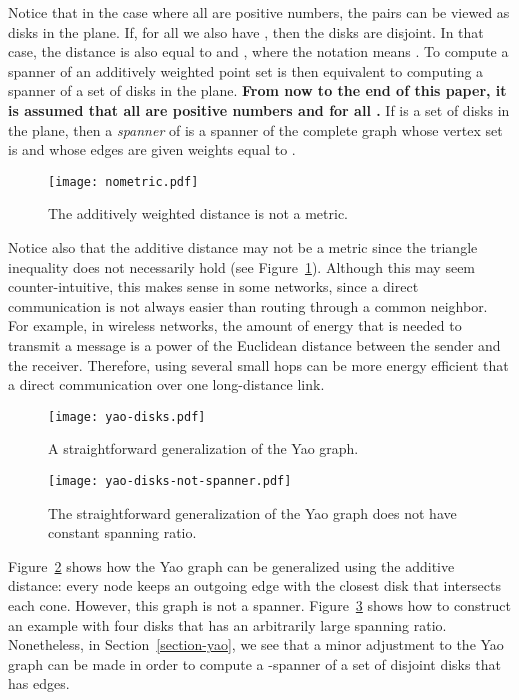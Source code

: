 \documentclass[pdftex,leqno,fleqn,12pt]{article}
\begin{document}
Notice that in the case where all  are positive numbers, the pairs
 can be viewed as disks  in the plane. If, for all  we
also have , then the disks are disjoint. In that case, the
distance  is also equal to
 and , where the notation 
means .  To compute a spanner of an additively weighted point
set is then equivalent to computing a spanner of a set of disks in the plane.
\textbf{From now to the end of this paper, it is assumed that all  are
positive numbers and  for all .} If  is a
set of disks in the plane, then a \emph{spanner} of  is a spanner
of the complete graph whose vertex set is  and whose edges
 are given weights equal to .

\begin{figure}
\centering\texttt{[image: nometric.pdf]}\caption{The additively weighted distance is not a
metric.}\label{fig-nometric}
\end{figure}

Notice also that the additive distance may not be a metric since the triangle inequality does not
necessarily hold (see Figure~\ref{fig-nometric}). Although this may seem counter-intuitive, this
makes sense in some networks, since a direct communication is not always easier than routing
through a common neighbor. For example, in wireless networks, the amount of energy that is needed
to transmit a message is a power of the Euclidean distance between the sender and the receiver.
Therefore, using several small hops can be more energy efficient that a direct communication over
one long-distance link.

\begin{figure}[htb]
\begin{center}
\texttt{[image: yao-disks.pdf]} \caption{A straightforward generalization of the Yao graph.}\label{fig-yao-disks}
\end{center}
\end{figure}

\begin{figure}[htb]
\begin{center}
\texttt{[image: yao-disks-not-spanner.pdf]}\caption{The straightforward generalization of the Yao graph
does not have constant spanning ratio.}\label{fig-yao-disks-not-spanner}
\end{center}
\end{figure}

Figure~\ref{fig-yao-disks} shows how the Yao graph can be generalized using the
additive distance: every node keeps an outgoing edge with the closest disk that
intersects each cone. However, this graph is not a spanner.
Figure~\ref{fig-yao-disks-not-spanner} shows how to construct an example with
four disks that has an arbitrarily large spanning ratio. Nonetheless, in
Section~\ref{section-yao}, we see that a minor adjustment to the Yao graph can
be made in order to compute a -spanner of a set of disjoint disks
that has  edges.
\end{document}
